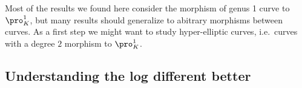 Most of the results we found here consider the morphism of genus 1 curve to $\pro^{1}_K$, but many results should generalize to abitrary morphisms between curves. 
As a first step we might want to study hyper-elliptic curves, i.e.\ curves with a degree $2$ morphism to $\pro^{1}_K$.

\subsection{Understanding the log different better} \label{sec:understanding_the_log_different_better}




